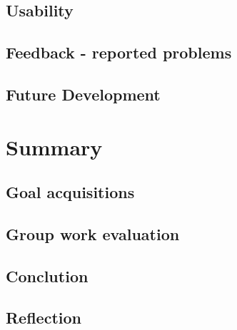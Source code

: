 \documentclass[BSP,english,oneside]{classes/gucthesis}
\begin{document}
	\section{Usability}
		\label{sec:usability}
		

	\section{Feedback - reported problems}
		\label{sec:feedback}
		

	\section{Future Development}
		\label{sec:future_development}
		


\chapter{Summary}
	\label{chap:summary}

	\section{Goal acquisitions}
		\label{sec:goal_aquisitions}
		

	\section{Group work evaluation}
		\label{sec:group_work}
		

	\section{Conclution}
		\label{sec:conclution}
		

	\section{Reflection}
		\label{sec:reflection}
		
		
\printnoidxglossary[sort=word]





\end{document}

